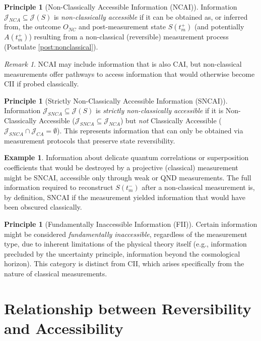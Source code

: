 \documentclass[11pt, a4paper]{article}
\theoremstyle{plain} %
\theoremstyle{definition} %
\newtheorem{principle}[theorem]{Principle}
\newtheorem{example}[theorem]{Example}
\theoremstyle{remark} %
\newtheorem{remark}[theorem]{Remark}
\newcommand{\Info}{\mathcal{J}} %
\newcommand{\TimePre}{t_m^-} %
\newcommand{\TimePost}{t_m^+} %
\newcommand{\StatePre}{S(\TimePre)} %
\newcommand{\StatePost}{S(\TimePost)} %
\newcommand{\OutcomeVal}{O} %
\begin{document}
	\begin{principle}[Non-Classically Accessible Information (NCAI)] \label{princ:NCAI}
		Information $\Info_{NCA} \subseteq \Info(S)$ is \emph{non-classically accessible} if it can be obtained as, or inferred from, the outcome $\OutcomeVal_{NC}$ and post-measurement state $\StatePost$ (and potentially $A(\TimePost)$) resulting from a non-classical (reversible) measurement process (Postulate \ref{post:nonclassical}).
	\end{principle}
	\begin{remark}
		NCAI may include information that is also CAI, but non-classical measurements offer pathways to access information that would otherwise become CII if probed classically.
	\end{remark}
	
	\begin{principle}[Strictly Non-Classically Accessible Information (SNCAI)] \label{princ:SNCAI}
		Information $\Info_{SNCA} \subseteq \Info(S)$ is \emph{strictly non-classically accessible} if it is Non-Classically Accessible ($\Info_{SNCA} \subseteq \Info_{NCA}$) but \emph{not} Classically Accessible ($\Info_{SNCA} \cap \Info_{CA} = \emptyset$). This represents information that can only be obtained via measurement protocols that preserve state reversibility.
	\end{principle}
	\begin{example}
		Information about delicate quantum correlations or superposition coefficients that would be destroyed by a projective (classical) measurement might be SNCAI, accessible only through weak or QND measurements. The full information required to reconstruct $\StatePre$ after a non-classical measurement is, by definition, SNCAI if the measurement yielded information that would have been obscured classically.
	\end{example}
	
	\begin{principle}[Fundamentally Inaccessible Information (FII)] \label{princ:FII}
		Certain information might be considered \emph{fundamentally inaccessible}, regardless of the measurement type, due to inherent limitations of the physical theory itself (e.g., information precluded by the uncertainty principle, information beyond the cosmological horizon). This category is distinct from CII, which arises specifically from the nature of classical measurements.
	\end{principle}
	
	
	\section{Relationship between Reversibility and Accessibility}
	
\end{document}
